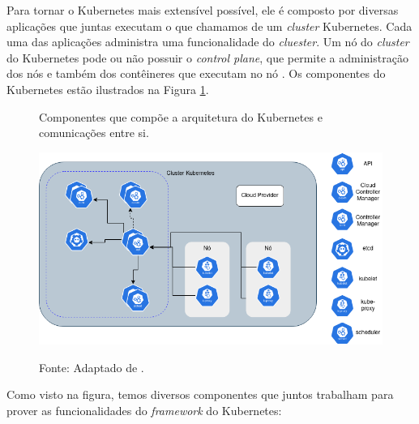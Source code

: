 Para tornar o Kubernetes mais extensível possível, ele é composto por diversas
aplicações que juntas executam o que chamamos de um \textit{cluster} Kubernetes.
Cada uma das aplicações administra uma funcionalidade do \textit{cluester}.
Um nó do \textit{cluster} do Kubernetes pode ou não possuir o \textit{control plane},
que permite a administração dos nós e também dos contêineres que executam no nó
\cite{kubernetes:components}. Os componentes do Kubernetes estão ilustrados na
Figura \ref{fig:kubernetes:components}.

\begin{figure}[h]
\centering
\caption{Componentes que compõe a arquitetura do Kubernetes e comunicações entre si.}
\includegraphics[scale=0.54]{images/kubernetes-components.png}
\label{fig:kubernetes:components}
\caption*{Fonte: Adaptado de \cite{kubernetes}.}
\end{figure}

Como visto na figura, temos diversos componentes que juntos trabalham para
prover as funcionalidades do \textit{framework} do Kubernetes:

